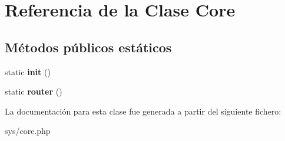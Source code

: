 \hypertarget{class_core}{}\section{Referencia de la Clase Core}
\label{class_core}
\subsection*{Métodos públicos estáticos}
\begin{DoxyCompactItemize}
\item 
\hypertarget{class_core_a9f0be6ae273d3669e11c29910a0be338}{}static {\bfseries init} ()\label{class_core_a9f0be6ae273d3669e11c29910a0be338}

\item 
\hypertarget{class_core_a172c2b8bbed5f8e23ea32e08b665b59b}{}static {\bfseries router} ()\label{class_core_a172c2b8bbed5f8e23ea32e08b665b59b}

\end{DoxyCompactItemize}


La documentación para esta clase fue generada a partir del siguiente fichero\+:\begin{DoxyCompactItemize}
\item 
sys/core.\+php\end{DoxyCompactItemize}

